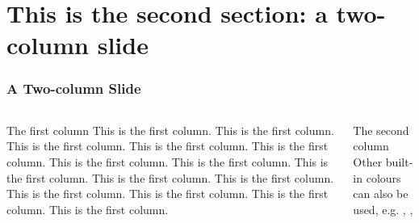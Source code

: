 \documentclass[10pt]{beamer}
\begin{document}
\section{This is the second section: a two-column slide}
\begin{frame}
\frametitle{A Two-column Slide}
\begin{columns} 
\begin{column}{0.5\textwidth} 
\begin{block}{The first column}
This is the first column.
This is the first column.
This is the first column.
This is the first column.
This is the first column.
This is the first column.
This is the first column.
This is the first column.
This is the first column.
This is the first column.
This is the first column.
This is the first column.
This is the first column.
This is the first column.
\end{block}
\end{column}
\begin{column}{0.5\textwidth} 
\begin{block}{The second column}
{\color{coreBlue}{This is the only ``Beihang colour'' I found. }} Other built-in colours can also be used, e.g. {\color{red}{red}}, {\color{orange}{orange}}, {\color{blue}{blue}}
\vspace{9.5em}
\end{block}
\end{column}
\end{columns}
\end{frame}
\end{document}
